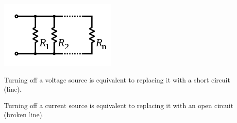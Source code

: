 \documentclass[nobib]{tufte-handout}
\begin{document}
\includegraphics[width=\textwidth/2]{images/220px-Resistors_in_parallel.svg.png}

Turning off a voltage source is equivalent to replacing it with a 
short circuit (line). 

Turning off a current source is equivalent to replacing it with an
open circuit (broken line). 
\end{document}
